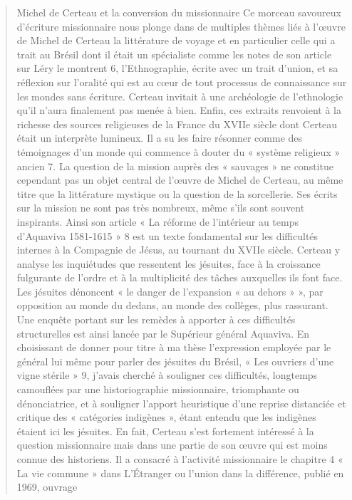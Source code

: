  \begin{quote}
     Michel de Certeau et la conversion du missionnaire Ce morceau savoureux d’écriture missionnaire nous plonge dans de multiples thèmes liés à l’œuvre de Michel de Certeau   la littérature de voyage et en particulier celle qui a trait au Brésil dont il était un spécialiste comme les notes de son article sur Léry le montrent 6,  l’Ethnographie, écrite avec un trait d’union, et sa réflexion sur l’oralité qui est au cœur de tout processus de connaissance sur les mondes sans écriture. Certeau invitait à une archéologie de l’ethnologie qu’il n’aura finalement pas menée à bien. Enfin, ces extraits renvoient à la richesse des sources religieuses de la France du XVIIe siècle dont Certeau était un interprète lumineux. Il a su les faire résonner comme des témoignages d’un monde qui commence à douter du « système religieux » ancien 7. La question de la mission auprès des « sauvages » ne constitue cependant pas un objet central de l’œuvre de Michel de Certeau, au même titre que la littérature mystique ou la question de la sorcellerie. Ses écrits sur la mission ne sont pas très nombreux, même s’ils sont souvent inspirants. Ainsi son article « La réforme de l’intérieur au temps d’Aquaviva 1581-1615 » 8 est un texte fondamental sur les difficultés internes à la Compagnie de Jésus, au tournant du XVIIe siècle. Certeau y analyse les inquiétudes que ressentent les jésuites, face à la croissance fulgurante de l’ordre et à la multiplicité des tâches auxquelles ils font face. Les jésuites dénoncent « le danger de l’expansion « au dehors » », par opposition au monde du dedans, au monde des collèges, plus rassurant. Une enquête portant sur les remèdes à apporter à ces difficultés structurelles est ainsi lancée par le Supérieur général Aquaviva. En choisissant de donner pour titre à ma thèse l’expression employée par le général lui même pour parler des jésuites du Brésil, « Les ouvriers d’une vigne stérile » 9, j’avais cherché à souligner ces difficultés, longtemps camouflées par une historiographie missionnaire, triomphante ou dénonciatrice, et à souligner l’apport heuristique d’une reprise distanciée et critique des « catégories indigènes », étant entendu que les indigènes étaient ici les jésuites. En fait, Certeau s’est fortement intéressé à la question missionnaire mais dans une partie de son œuvre qui est moins connue des historiens. Il a consacré à l’activité missionnaire le chapitre 4 « La vie commune » dans L’Étranger ou l’union dans la différence, publié en 1969, ouvrage 
 \end{quote}

